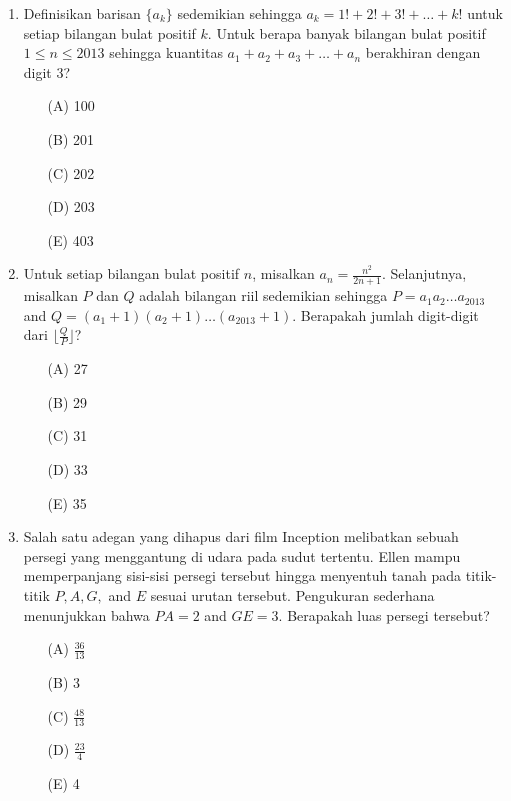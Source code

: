 \documentclass[12pt]{scrartcl}
\begin{document}
\begin{enumerate}
    \item Definisikan barisan $\{a_{k}\}$ sedemikian sehingga $a_{k}=1!+2!+3!+\dots+k!$ untuk setiap bilangan bulat positif $k$. Untuk berapa banyak bilangan bulat positif $1\le n\le 2013$ sehingga kuantitas $a_{1}+a_{2}+a_{3}+\dots+a_{n}$ berakhiran dengan digit 3?
    \begin{itemize}
        \item[(A)] 100
        \item[(B)] 201
        \item[(C)] 202
        \item[(D)] 203
        \item[(E)] 403
    \end{itemize}

    \item Untuk setiap bilangan bulat positif $n$, misalkan $a_{n}=\frac{n^{2}}{2n+1}$. Selanjutnya, misalkan $P$ dan $Q$ adalah bilangan riil sedemikian sehingga $P=a_{1}a_{2}\dots a_{2013}$ and $Q=(a_{1}+1)(a_{2}+1)\dots(a_{2013}+1)$. Berapakah jumlah digit-digit dari $\lfloor\frac{Q}{P}\rfloor$?
    \begin{itemize}
        \item[(A)] 27
        \item[(B)] 29
        \item[(C)] 31
        \item[(D)] 33
        \item[(E)] 35
    \end{itemize}

    \item Salah satu adegan yang dihapus dari film Inception melibatkan sebuah persegi yang menggantung di udara pada sudut tertentu. Ellen mampu memperpanjang sisi-sisi persegi tersebut hingga menyentuh tanah pada titik-titik $P, A, G,$ and $E$ sesuai urutan tersebut. Pengukuran sederhana menunjukkan bahwa $PA=2$ and $GE=3$. Berapakah luas persegi tersebut?
    \begin{itemize}
        \item[(A)] $\frac{36}{13}$
        \item[(B)] 3
        \item[(C)] $\frac{48}{13}$
        \item[(D)] $\frac{23}{4}$
        \item[(E)] 4
    \end{itemize}


\end{enumerate}
\end{document}
